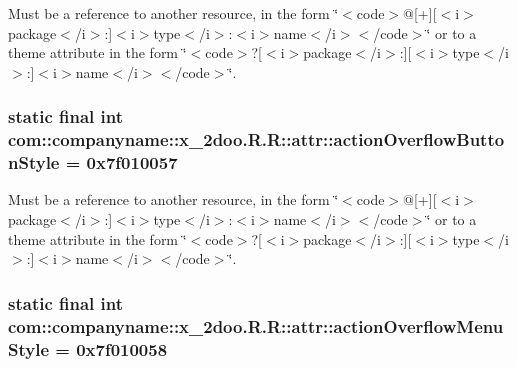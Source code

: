 Must be a reference to another resource, in the form \char`\"{}$<$code$>$@\mbox{[}+\mbox{]}\mbox{[}$<$i$>$package$<$/i$>$:\mbox{]}$<$i$>$type$<$/i$>$:$<$i$>$name$<$/i$>$$<$/code$>$\char`\"{} or to a theme attribute in the form \char`\"{}$<$code$>$?\mbox{[}$<$i$>$package$<$/i$>$:\mbox{]}\mbox{[}$<$i$>$type$<$/i$>$:\mbox{]}$<$i$>$name$<$/i$>$$<$/code$>$\char`\"{}. \hypertarget{classcom_1_1companyname_1_1x__2doo_1_1_r_1_1attr_5621a921de85c2b7789c7e83cc781f1d}{
\subsubsection[{actionOverflowButtonStyle}]{\setlength{\rightskip}{0pt plus 5cm}static final int com::companyname::x\_\-2doo.R.R::attr::actionOverflowButtonStyle = 0x7f010057}}
\label{classcom_1_1companyname_1_1x__2doo_1_1_r_1_1attr_5621a921de85c2b7789c7e83cc781f1d}


Must be a reference to another resource, in the form \char`\"{}$<$code$>$@\mbox{[}+\mbox{]}\mbox{[}$<$i$>$package$<$/i$>$:\mbox{]}$<$i$>$type$<$/i$>$:$<$i$>$name$<$/i$>$$<$/code$>$\char`\"{} or to a theme attribute in the form \char`\"{}$<$code$>$?\mbox{[}$<$i$>$package$<$/i$>$:\mbox{]}\mbox{[}$<$i$>$type$<$/i$>$:\mbox{]}$<$i$>$name$<$/i$>$$<$/code$>$\char`\"{}. \hypertarget{classcom_1_1companyname_1_1x__2doo_1_1_r_1_1attr_4c639720f9410fb0440f18797bf83998}{
\subsubsection[{actionOverflowMenuStyle}]{\setlength{\rightskip}{0pt plus 5cm}static final int com::companyname::x\_\-2doo.R.R::attr::actionOverflowMenuStyle = 0x7f010058}}
\label{classcom_1_1companyname_1_1x__2doo_1_1_r_1_1attr_4c639720f9410fb0440f18797bf83998}


